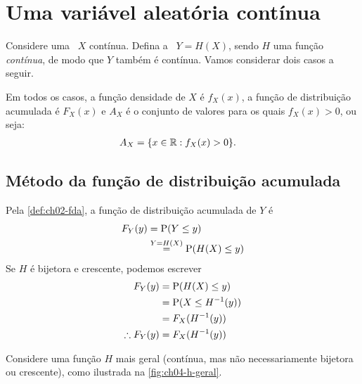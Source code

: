 \section{Uma variável aleatória contínua}

Considere uma \va\ $X$ contínua. Defina a \va\ $Y = H(X)$,
sendo $H$ uma função \textit{contínua},
de modo que $Y$ também é contínua.
Vamos considerar dois casos a seguir.

Em todos os casos, a função densidade de $X$ é $f_X(x)$,
a função de distribuição acumulada é $F_X(x)$ e $A_X$ é o conjunto
de valores para os quais $f_X(x) > 0$, ou seja:
\begin{align*}
    A_X &= \{x \in \R: f_X(x) > 0\}.
\end{align*}

\subsection{Método da função de distribuição acumulada}

Pela \cref{def:ch02-fda}, a função de distribuição acumulada de $Y$ é
\begin{align*}
    F_Y(y) &= \Prob(Y \le y) \\
    &\overset{Y = H(X)}{=} \Prob(H(X) \le y)
\end{align*}
Se $H$ é bijetora e crescente, podemos escrever
\begin{align}
    F_Y(y) &= \Prob(H(X) \le y) \notag \\
    &= \Prob(X \le H^{-1}(y)) \notag \\
    &= F_X(H^{-1}(y)) \notag \\
    \therefore F_Y(y) &= F_X(H^{-1}(y))
    \label{eq:ch04-metodo-fda-simpl}
\end{align}

Considere uma função $H$ mais geral (contínua, mas não
necessariamente bijetora ou crescente), como ilustrada na 
\cref{fig:ch04-h-geral}.

\begin{figure}[!ht]
    \centering
    \begin{tikzpicture}
    \end{tikzpicture}
\end{figure}


